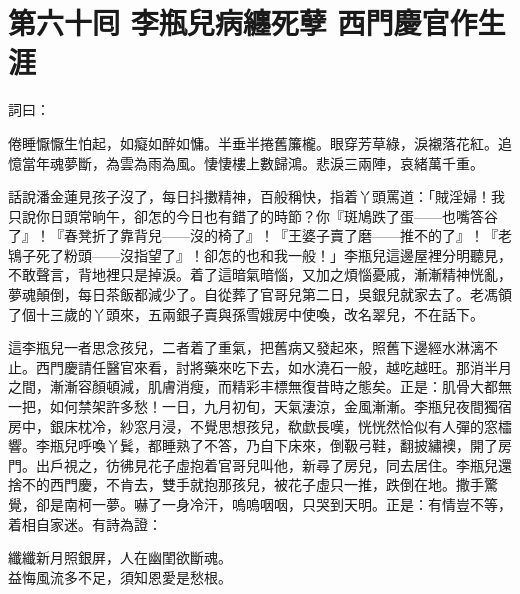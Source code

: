 
\chapter*{第六十囘 李瓶兒病纏死孽 西門慶官作生涯}


詞曰：

\begin{myquote}
倦睡懨懨生怕起，如癡如醉如慵。半垂半捲舊簾櫳。眼穿芳草綠，淚襯落花紅。追憶當年魂夢斷，為雲為雨為風。悽悽樓上數歸鴻。悲淚三兩陣，哀緒萬千重。

\end{myquote}

話說潘金蓮見孩子沒了，每日抖擻精神，百般稱快，指着丫頭罵道：「賊淫婦！我只說你日頭常晌午，卻怎的今日也有錯了的時節？你『斑鳩跌了蛋——也嘴答谷了』！『春凳折了靠背兒——沒的椅了』！『王婆子賣了磨——推不的了』！『老鴇子死了粉頭——沒指望了』！卻怎的也和我一般！」{}李瓶兒這邊屋裡分明聽見，不敢聲言，背地裡只是掉淚。着了這暗氣暗惱，又加之煩惱憂戚，漸漸精神恍亂，夢魂顛倒，每日茶飯都減少了。自從葬了官哥兒第二日，吳銀兒就家去了。老馮領了個十三歲的丫頭來，五兩銀子賣與孫雪娥房中使喚，改名翠兒，不在話下。

這李瓶兒一者思念孩兒，二者着了重氣，把舊病又發起來，照舊下邊經水淋漓不止。西門慶請任醫官來看，討將藥來吃下去，如水澆石一般，越吃越旺。那消半月之間，漸漸容顏頓減，肌膚消瘦，而精彩丰標無復昔時之態矣。正是：肌骨大都無一把，如何禁架許多愁！一日，九月初旬，天氣淒涼，金風漸漸。李瓶兒夜間獨宿房中，銀床枕冷，紗窓月浸，不覺思想孩兒，欷歔長嘆，恍恍然恰似有人彈的窓櫺響。李瓶兒呼喚丫鬂，都睡熟了不答，乃自下床來，倒靸弓鞋，翻披繡襖，開了房門。出戶視之，彷彿見花子虛抱着官哥兒叫他，新尋了房兒，同去居住。李瓶兒還捨不的西門慶，不肯去，雙手就抱那孩兒，被花子虛只一推，跌倒在地。撒手驚覺，卻是南柯一夢。嚇了一身冷汗，嗚嗚咽咽，只哭到天明。{}正是：有情豈不等，着相自家迷。有詩為證：

\begin{myquote}
纖纖新月照銀屏，人在幽閨欲斷魂。\\益悔風流多不足，須知恩愛是愁根。
\end{myquote}

